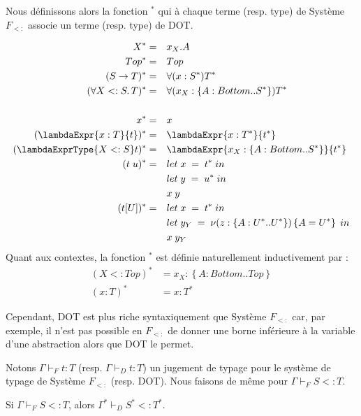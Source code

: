 Nous définissons alors la fonction ${}^{*}$ qui à chaque terme (resp. type) de
Système $F_{<:}$ associe un terme (resp. type) de DOT.

\begin{align*}
  X^{*} & = && x_{X}.A \\
  Top^{*} & = && Top \\
  (S \rightarrow T)^{*} & = && \forall(x : S^{*}) T^{*} \\
  (\forall X <: S . \, T)^{*} & = && \forall(x_{X} : \left\{ A : Bottom .. S^{*} \right\}) T^{*} \\ \\
  x^{*} & = && x \\
  (\lambdaExpr{x : T}{t})^{*} & = && \lambdaExpr{x : T^{*}}{t^{*}} \\
  (\lambdaExprType{X <: S}t)^{*} & = && \lambdaExpr{x_{X} : \left\{ A : Bottom .. S^{*} \right\}}{t^{*}} \\
  (t \; u)^{*} & = && let \; x \; = \; t^{*} \; in \\
              &  && let \; y \; = \; u^{*} \; in \\
              &  && x \; y \\
   (t[U])^{*}  & = && let \; x \; = \; t^{*} \; in \\
              &  && let \; y_{Y} \; = \; \nu(z : \left\{ A : U^{*} .. U^{*} \right\}) \left\{ A = U^{*} \right\} \; in \\
              &  && x \; y_{Y}
\end{align*}
Quant aux contextes, la fonction ${}^{*}$ est définie naturellement
inductivement par :
\begin{align*}
  (X <: Top)^{*} & = x_{X} : \left\{ A : Bottom .. Top \right\} \\
  (x : T)^{*} & = x : T^{*}
\end{align*}

Cependant, DOT est plus riche syntaxiquement que Système $F_{<:}$ car, par
exemple, il n'est pas possible en $F_{<:}$ de donner une borne inférieure à la
variable d'une abstraction alors que DOT le permet.


Notons $\Gamma \vdash_{F} t : T$ (resp. $\Gamma \vdash_{D} t : T$) un jugement
de typage pour le système de typage de Système $F_{<:}$ (resp. DOT). Nous faisons
de même pour $\Gamma \vdash_{F} S <: T$.

\begin{theorem}
  Si $\Gamma \vdash_{F} S <: T$, alors $\Gamma^{*} \vdash_{D} S^{*} <: T^{*}$.
\end{theorem}


